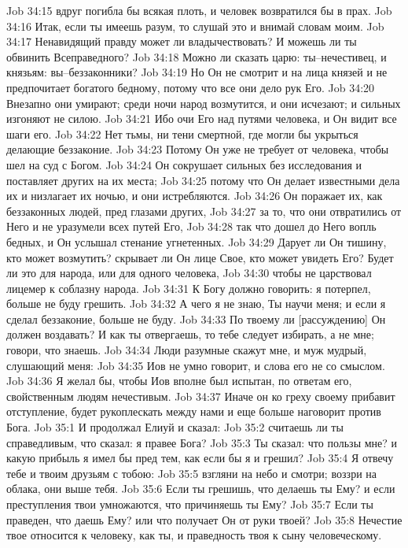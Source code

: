 Job 34:15  вдруг погибла бы всякая плоть, и человек возвратился бы в прах.
Job 34:16  Итак, если ты имеешь разум, то слушай это и внимай словам моим.
Job 34:17  Ненавидящий правду может ли владычествовать? И можешь ли ты обвинить Всеправедного?
Job 34:18  Можно ли сказать царю: ты--нечестивец, и князьям: вы--беззаконники?
Job 34:19  Но Он не смотрит и на лица князей и не предпочитает богатого бедному, потому что все они дело рук Его.
Job 34:20  Внезапно они умирают; среди ночи народ возмутится, и они исчезают; и сильных изгоняют не силою.
Job 34:21  Ибо очи Его над путями человека, и Он видит все шаги его.
Job 34:22  Нет тьмы, ни тени смертной, где могли бы укрыться делающие беззаконие.
Job 34:23  Потому Он уже не требует от человека, чтобы шел на суд с Богом.
Job 34:24  Он сокрушает сильных без исследования и поставляет других на их места;
Job 34:25  потому что Он делает известными дела их и низлагает их ночью, и они истребляются.
Job 34:26  Он поражает их, как беззаконных людей, пред глазами других,
Job 34:27  за то, что они отвратились от Него и не уразумели всех путей Его,
Job 34:28  так что дошел до Него вопль бедных, и Он услышал стенание угнетенных.
Job 34:29  Дарует ли Он тишину, кто может возмутить? скрывает ли Он лице Свое, кто может увидеть Его? Будет ли это для народа, или для одного человека,
Job 34:30  чтобы не царствовал лицемер к соблазну народа.
Job 34:31  К Богу должно говорить: я потерпел, больше не буду грешить.
Job 34:32  А чего я не знаю, Ты научи меня; и если я сделал беззаконие, больше не буду.
Job 34:33  По твоему ли [рассуждению] Он должен воздавать? И как ты отвергаешь, то тебе следует избирать, а не мне; говори, что знаешь.
Job 34:34  Люди разумные скажут мне, и муж мудрый, слушающий меня:
Job 34:35  Иов не умно говорит, и слова его не со смыслом.
Job 34:36  Я желал бы, чтобы Иов вполне был испытан, по ответам его, свойственным людям нечестивым.
Job 34:37  Иначе он ко греху своему прибавит отступление, будет рукоплескать между нами и еще больше наговорит против Бога.
Job 35:1  И продолжал Елиуй и сказал:
Job 35:2  считаешь ли ты справедливым, что сказал: я правее Бога?
Job 35:3  Ты сказал: что пользы мне? и какую прибыль я имел бы пред тем, как если бы я и грешил?
Job 35:4  Я отвечу тебе и твоим друзьям с тобою:
Job 35:5  взгляни на небо и смотри; воззри на облака, они выше тебя.
Job 35:6  Если ты грешишь, что делаешь ты Ему? и если преступления твои умножаются, что причиняешь ты Ему?
Job 35:7  Если ты праведен, что даешь Ему? или что получает Он от руки твоей?
Job 35:8  Нечестие твое относится к человеку, как ты, и праведность твоя к сыну человеческому.
